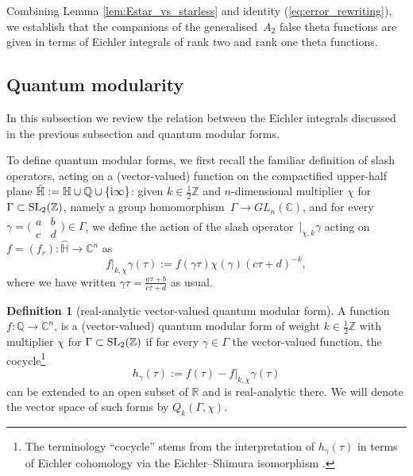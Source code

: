 \documentclass[pdftex]{sigma}
\def\BR{\mathbb{R}}
\def\BC{\mathbb{C}}
\def\BZ{\mathbb{Z}}
\theoremstyle{definition}
\newtheorem{defn}[thm]{Definition}
\numberwithin{equation}{section}
\begin{document}
Combining Lemma \ref{lem:Estar_vs_starless} and identity (\ref{eq:error_rewriting}), we establish that the companions of the generalised~$A_2$ false theta functions are given in terms of Eichler integrals of rank two and rank one theta functions.

\subsection{Quantum modularity}
\label{subsec:QM}

In this subsection we review the relation between the Eichler integrals discussed in the previous subsection and quantum modular forms.

To define quantum modular forms, we first recall the familiar definition of slash operators, acting on a (vector-valued) function on the compactified upper-half plane $\hat {\mathbb H} := \mathbb H\cup {\mathbb Q} \cup \{{\rm i}\infty\}$: given $k\in\frac{1}{2}\BZ$ and $n$-dimensional multiplier $\chi$ for $\Gamma\subset {\rm SL}_2(\mathbb Z)$, namely a group homomorphism~$\Gamma \to GL_n(\mathbb C)$, and for every $\gamma=\bigl(\begin{smallmatrix} a & b \\ c & d \end{smallmatrix}\bigr)\in\Gamma$, we define the action of the slash operator~$\lvert_{\chi,k}\gamma$ acting on $f=(f_r)\colon\hat {\mathbb H}\to \mathbb C^n$ as
\begin{equation*}
 f\lvert_{k,\chi}\gamma(\tau) := f(\gamma\tau)\chi(\gamma) (c\tau+d)^{-k},
\end{equation*}
where we have written $\gamma \tau = \frac{a\tau+b}{c\tau+d}$ as usual.

\begin{defn}[real-analytic vector-valued quantum modular form]\label{dfn:qmf}
A function $f\colon {\mathbb Q}\to\BC^n$, is a (vector-valued) quantum modular form of weight $k\in\frac{1}{2}\BZ$ with multiplier $\chi$ for $\Gamma \subset {\rm SL}_2(\BZ)$ if for every $\gamma\in\Gamma$ the vector-valued function, the cocycle\footnote{The terminology ``cocycle'' stems from the interpretation of $h_\gamma(\tau)$ in terms of Eichler cohomology via the Eichler--Shimura isomorphism \cite{Eichler1957, Shimura1959SurLI}.}
\[
	h_\gamma(\tau) := f(\tau) - f\lvert_{k,\chi}\gamma(\tau)
\]
can be extended to an open subset of $\BR$ and is real-analytic there. We will denote the vector space of such forms by ${Q}_k(\Gamma,\chi)$.
\end{defn}
\end{document}
